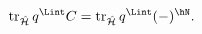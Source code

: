 \begin{equation}
%
\mbox{tr}_{\hat{\cal H}} \, q^{\Lint} C
        = \mbox{tr}_{\hat{\cal H}} \, q^{\Lint} (-)^{\hN}.
\label{eq:noghost3}
%
\end{equation}

